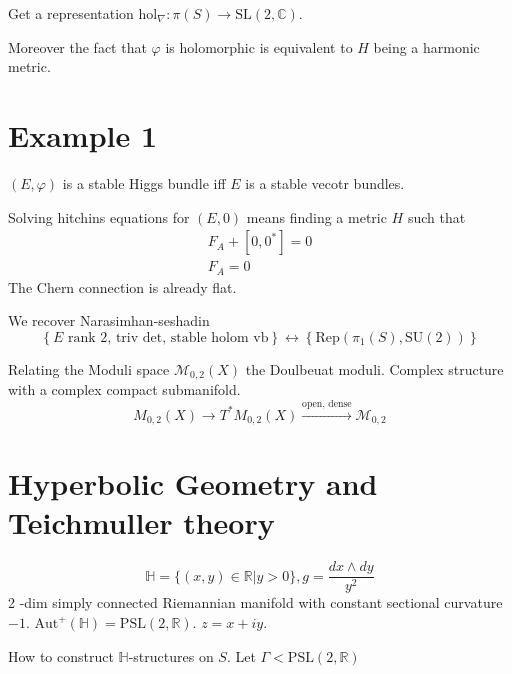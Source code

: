 Get a representation $ \mathrm{hol}_\nabla : \pi(S) \rightarrow \mathrm{SL}(2, \mathbb{C} ) $. 

Moreover the fact that $ \varphi$ is holomorphic is equivalent to $H$ being a harmonic metric. 



 

\section{Example 1} %

$(E, \varphi)$ is a stable Higgs bundle iff $E$ is a stable vecotr bundles. 

Solving hitchins equations for $ (E, 0 ) $ means finding a metric $H$ such that 
\begin{align}
    F_A + [0,0^*] = 0 \\
    F_A = 0 
\end{align}
The Chern connection is already flat. 

We recover Narasimhan-seshadin
\begin{equation}
    \left\{ E \mbox{ rank 2, triv det, stable holom vb} \right\} \leftrightarrow 
    \left\{ \mathrm{Rep}( \pi_1 ( S) , \mathrm{SU}(2) ) \right\} 
\end{equation}

Relating the Moduli space $ \mathcal{M} _{0,2} (X)$ the Doulbeuat moduli. 
Complex structure with a complex compact submanifold. 
\begin{equation}
    M_{0,2} (X) \rightarrow T^* M_{0,2} (X) \xrightarrow{ \mbox{open, dense} } \mathcal{M} _{0,2}
\end{equation}



\section{Hyperbolic Geometry and Teichmuller theory} %

\begin{equation}
    \mathbb{H} = \{ (x,y) \in \mathbb{R}  | y> 0 \}, g = \frac{dx \wedge dy }{ y^2} 
\end{equation}
2 -dim simply connected Riemannian manifold with constant sectional curvature $-1$. 
$ \mathrm{Aut}^+ ( \mathbb{H} ) = \mathrm{PSL}(2, \mathbb{R} ) $. 
$z = x + iy $. 

How to construct $ \mathbb{H}$-structures on $S $. 
Let $ \Gamma < \mathrm{PSL}(2, \mathbb{R}) $ 

